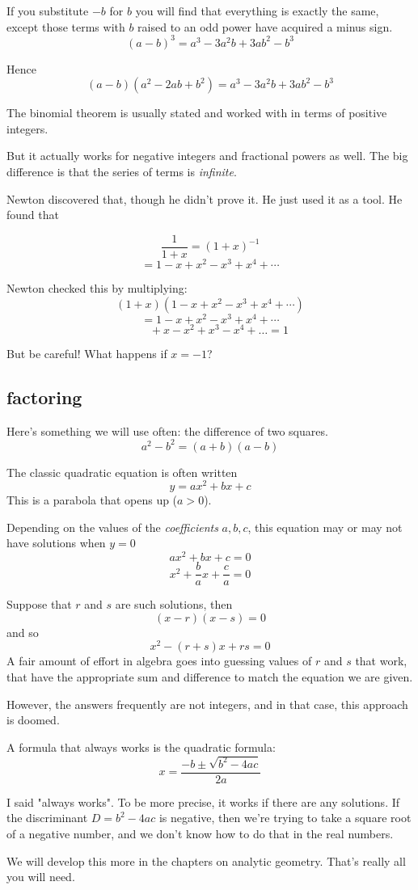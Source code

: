 \documentclass[11pt, oneside]{article}
\begin{document}
If you substitute $-b$ for $b$ you will find that everything is exactly the same, except those terms with $b$ raised to an odd power have acquired a minus sign.
\[ (a - b)^3 = a^3 - 3a^2b + 3ab^2 - b^3 \]

Hence
\[ (a-b)(a^2 - 2ab + b^2) = a^3 - 3a^2b + 3ab^2 - b^3 \]

The binomial theorem is usually stated and worked with in terms of positive integers.  

But it actually works for negative integers and fractional powers as well.  The big difference is that the series of terms is \emph{infinite}.

Newton discovered that, though he didn't prove it.  He just used it as a tool.  He found that

\[ \frac{1}{1 + x} = (1+x)^{-1} \]
\[ = 1 - x + x^2 - x^3 + x^4 + \cdots  \]

Newton checked this by multiplying:
\[ (1+x)(1 - x + x^2 - x^3 + x^4 + \cdots) \]
\[ = 1 - x + x^2 - x^3 + x^4 + \cdots \]
\[ \ \ \ \ \ \ \ + x - x^2 + x^3 - x^4 + \dots = 1  \]

But be careful!  What happens if $x = -1$?

\subsection*{factoring}
Here's something we will use often:  the difference of two squares.
\[ a^2 - b^2 = (a + b)(a - b) \]

The classic quadratic equation is often written
\[ y = ax^2 + bx + c \]
This is a parabola that opens up ($a > 0$).  

Depending on the values of the \emph{coefficients} $a,b,c$, this equation may or may not have solutions when $y = 0$
\[ ax^2 + bx + c = 0 \]
\[ x^2 + \frac{b}{a}x + \frac{c}{a} = 0 \]

Suppose that $r$ and $s$ are such solutions, then 
\[ (x - r)(x - s) = 0 \]
and so
\[ x^2 - (r + s)x + rs = 0 \]
A fair amount of effort in algebra goes into guessing values of $r$ and $s$ that work, that have the appropriate sum and difference to match the equation we are given.

However, the answers frequently are not integers, and in that case, this approach is doomed.  

A formula that always works is the quadratic formula:
\[ x = \frac{-b \pm \sqrt{b^2 - 4ac}}{2a} \]

I said "always works".  To be more precise, it works if there are any solutions.  If the discriminant $D = b^2 - 4ac$ is negative, then we're trying to take a square root of a negative number, and we don't know how to do that in the real numbers.

We will develop this more in the chapters on analytic geometry.  That's really all you will need.
\end{document}
